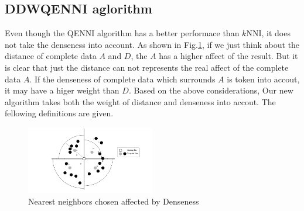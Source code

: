 \documentclass[print]{jicspack}
\begin{document}
\subsection{DDWQENNI aglorithm}
\label{2.4}
Even though the QENNI algorithm has a better performace than $k$NNI, it does not take the denseness into account. As shown in Fig.\ref{fig:figure3}, if we just think about the distance of complete data $A$ and $D$, the $A$ has a higher affect of the result. But it is clear that just the distance can not represents the real affect of the complete data $A$. If the denseness of complete data which surrounds $A$ is token into accout, it may have a higer weight than $D$. Based on the above considerations, Our new algorithm takes both the weight of distance and denseness into accout. The fellowing definitions are given.
\begin{figure}[h]
\centering
\includegraphics[angle=0, width=0.5\textwidth]{figure3.png}
\caption{Nearest neighbors chosen affected by Denseness}
\label{fig:figure3}
\end{figure}
\end{document}
